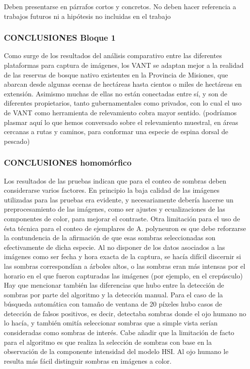 Deben presentarse en párrafos cortos y concretos. No deben hacer referencia a trabajos futuros ni a hipótesis no incluidas en el trabajo
\subsubsection{CONCLUSIONES Bloque 1}
Como surge de los resultados del análisis comparativo entre las diferentes plataformas para captura de imágenes, los VANT se adaptan mejor a la realidad de las reservas de bosque nativo existentes en la Provincia de Misiones, que abarcan desde algunas ecenas de hectáreas hasta cientos o miles de hectáreas en extensión. Asimismo muchas de ellas no están conectadas entre sí, y son de diferentes propietarios, tanto gubernamentales como privados, con lo cual el uso de VANT como herramienta de relevamiento cobra mayor sentido. \color{magenta}(podríamos plasmar aquí lo que hemos conversado sobre el relevamiento muestral, en áreas cercanas a rutas y caminos, para conformar una especie de espina dorsal de pescado)
\color{black} 
\subsubsection{CONCLUSIONES homomórfico}
Los resultados de las pruebas indican que para el conteo de sombras deben considerarse varios factores. En principio la baja calidad de las imágenes utilizadas para las pruebas era evidente, y necesariamente debería hacerse un preprocesamiento de las imágenes, como ser ajustes y ecualizaciones de las componentes de color, para mejorar el contraste. Otra limitación para el uso de ésta técnica para el conteo de ejemplares de A. polyneuron es que debe reforzarse la contundencia de la afirmación de que esas sombras seleccionadas son efectivamente de dicha especie. Al no disponer de los datos asociados a las imágenes como ser fecha y hora exacta de la captura, se hacía difícil discernir si las sombras correspondían a árboles altos, o las sombras eran más intensas por el horario en el que fueron capturadas las imágenes (por ejemplo, en el crepúsculo) Hay que mencionar también las diferencias que hubo entre la detección de sombras por parte del algoritmo y la detección manual. Para el caso de la búsqueda automática con tamaño de ventana de 20 píxeles hubo casos de detección de falsos positivos, es decir, detectaba sombras donde el ojo humano no lo hacía, y también omitía seleccionar sombras que a simple vista serían consideradas como sombras de interés. Cabe añadir que la limitación de facto para el algoritmo es que realiza la selección de sombras con base en la observación de la componente intensidad del modelo HSI. Al ojo humano le resulta más fácil distinguir sombras en imágenes a color.

